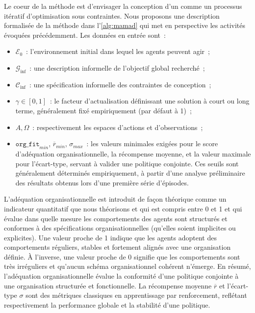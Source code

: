Le coeur de la méthode  est d'envisager la conception d'un  comme un processus itératif d'optimisation sous contraintes. Nous proposons une description formalisée de la méthode  dans l'\autoref{alg:mamad} qui met en perspective les activités évoquées précédemment. Les données en entrée sont~:
\begin{itemize}
  \item $\mathcal{E}_0$~: l'environnement initial dans lequel les agents peuvent agir~;
  \item $\mathcal{G}_{\text{inf}}$~: une description informelle de l'objectif global recherché~;
  \item $\mathcal{C}_{\text{inf}}$~: une spécification informelle des contraintes de conception~;
  \item $\gamma \in [0,1]$~: le facteur d'actualisation définissant une solution à court ou long terme, généralement fixé empiriquement (par défaut à 1)~;
  \item $A, \Omega$~: respectivement les espaces d'actions et d'observations~;
  \item $\texttt{org\_fit}_{min}$, $\overline{r}_{min}$, $\sigma_{max}$~: les valeurs minimales exigées pour le score d'adéquation organisationnelle, la récompense moyenne, et la valeur maximale pour l'écart-type, servant à valider une politique conjointe. Ces seuils sont généralement déterminés empiriquement, à partir d'une analyse préliminaire des résultats obtenus lors d'une première série d'épisodes.
\end{itemize}

L'adéquation organisationnelle est introduit de façon théorique comme un indicateur quantitatif que nous théorisons et qui est compris entre 0 et 1 et qui évalue dans quelle mesure les comportements des agents sont structurés et conformes à des spécifications organisationnelles (qu'elles soient implicites ou explicites). Une valeur proche de 1 indique que les agents adoptent des comportements réguliers, stables et fortement alignés avec une organisation définie. À l'inverse, une valeur proche de 0 signifie que les comportements sont très irréguliers et qu'aucun schéma organisationnel cohérent n'émerge. En résumé, l'adéquation organisationnelle évalue la conformité d'une politique conjointe à une organisation structurée et fonctionnelle.
La récompense moyenne $\overline{r}$ et l'écart-type $\sigma$ sont des métriques classiques en apprentissage par renforcement, reflétant respectivement la performance globale et la stabilité d'une politique.


